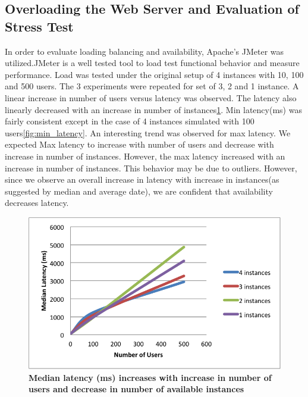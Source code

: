 \documentclass[12pt]{article}
\begin{document}
\subsection{Overloading the Web Server and Evaluation of Stress Test}
In order to evaluate loading balancing and availability, Apache's JMeter was utilized.JMeter is a well tested tool to load test functional behavior and measure performance\cite{apache}. Load was tested under the original setup of 4 instances with 10, 100 and 500 users. The 3 experiments were repeated for set of 3, 2 and 1 instance. A linear increase in number of users versus latency was observed. The latency also linearly decreased with an increase in number of instances\ref{fig:median_latency}. Min latency(ms) was fairly consistent except in the case of 4 instances simulated with 100 users\ref{fig:min_latency}. An interesting trend was observed for max latency. We expected Max latency to increase with number of users and decrease with increase in number of instances. However, the max latency increased with an increase in number of instances. This behavior may be due to outliers. However, since we observe an overall increase in latency with increase in instances(as suggested by median and average date), we are confident that availability decreases latency. 
\begin{figure}[H]
  \centering
      \includegraphics[scale=0.45]{Images/median_latency.png}
  \caption{\textbf{Median latency (ms) increases with increase in number of users and decrease in number of available instances} }
\label{fig:median_latency}
\end{figure}
\end{document}
